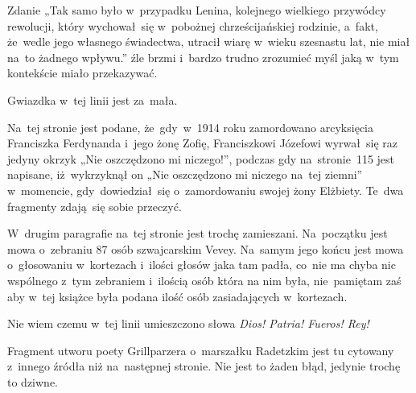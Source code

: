 \documentclass[a4paper,11pt]{article}
\begin{document}
\vspace{\spaceFour}



\start {} Zdanie „Tak samo było w~przypadku Lenina,
kolejnego wielkiego przywódcy rewolucji, który wychował~się w~pobożnej
chrześcijańskiej rodzinie, a~fakt, że~wedle jego własnego świadectwa,
utracił wiarę w~wieku szesnastu lat, nie miał na~to żadnego wpływu.”
źle brzmi i~bardzo trudno zrozumieć myśl jaką w~tym kontekście miało
przekazywać.

\vspace{\spaceFour}



\start {} Gwiazdka w~tej linii jest za~mała.

\vspace{\spaceFour}



\start {} Na~tej stronie jest podane, że~gdy~w~1914 roku
zamordowano arcyksięcia Franciszka Ferdynanda i~jego żonę Zofię,
Franciszkowi Józefowi wyrwał~się raz jedyny okrzyk „Nie oszczędzono mi
niczego!”, podczas gdy na~stronie~115 jest napisane, iż~wykrzyknął on
„Nie oszczędzono mi niczego na~tej ziemni” w~momencie,
gdy~dowiedział~się o~zamordowaniu swojej żony Elżbiety. Te~dwa
fragmenty zdają~się sobie przeczyć.

\vspace{\spaceFour}



\start {} W~drugim paragrafie na~tej stronie jest trochę
zamieszani. Na~początku jest mowa o~zebraniu 87 osób szwajcarskim
Vevey. Na~samym jego końcu jest mowa o~głosowaniu w~kortezach i~ilości
głosów jaka tam padła, co~nie ma chyba nic wspólnego z~tym zebraniem
i~ilością osób która na nim była, nie~pamiętam zaś aby w~tej książce
była podana ilość osób zasiadających w~kortezach.

\vspace{\spaceFour}



\start {} Nie wiem czemu w~tej linii umieszczono słowa
\textit{Dios! Patria! Fueros! Rey!}

\vspace{\spaceFour}



\start {} Fragment utworu poety Grillparzera o~marszałku
Radetzkim jest tu cytowany z~innego źródła niż na~następnej stronie.
Nie jest to żaden błąd, jedynie trochę to dziwne.
\end{document}
